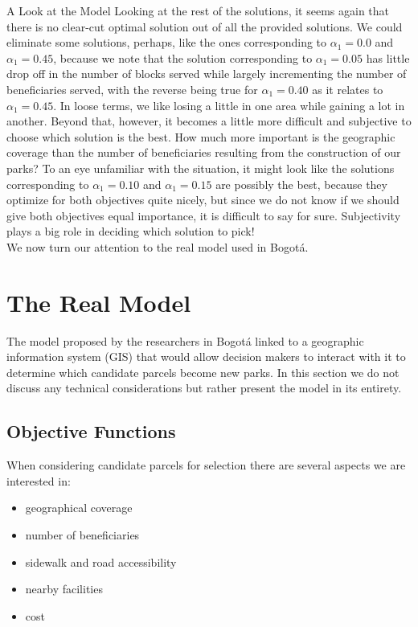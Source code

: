 \documentclass[12pt]{pom_thesis}
\theoremstyle{definition}
\begin{document}
\begin{chapter}{A Look at the Model}
Looking at the rest of the solutions, it seems again that there is no clear-cut optimal solution out of all the provided solutions. We could eliminate some solutions, perhaps, like the ones corresponding to $\alpha_1 = 0.0$ and $\alpha_1 = 0.45$, because we note that the solution corresponding to $\alpha_1 = 0.05$ has little drop off in the number of blocks served while largely incrementing the number of beneficiaries served, with the reverse being true for $\alpha_1 = 0.40$ as it relates to $\alpha_1 = 0.45$. In loose terms, we like losing a little in one area while gaining a lot in another. Beyond that, however, it becomes a little more difficult and subjective to choose which solution is the best. How much more important is the geographic coverage than the number of beneficiaries resulting from the construction of our parks? To an eye unfamiliar with the situation, it might look like the solutions corresponding to $\alpha_1 = 0.10$ and $\alpha_1 = 0.15$ are possibly the best, because they optimize for both objectives quite nicely, but since we do not know if we should give both objectives equal importance, it is difficult to say for sure. Subjectivity plays a big role in deciding which solution to pick! \\

We now turn our attention to the real model used in Bogot\'{a}.
%
%
\section{The Real Model}
The model proposed by the researchers in Bogot\'{a} linked to a geographic information system (GIS) that would allow decision makers to interact with it to determine which candidate parcels become new parks. In this section we do not discuss any technical considerations but rather present the model in its entirety. \\

%
%
\subsection{Objective Functions}
When considering candidate parcels for selection there are several aspects we are interested in:
\newpage
\begin{itemize}
\item geographical coverage 
\item number of beneficiaries
\item sidewalk and road accessibility
\item nearby facilities
\item cost 
\end{itemize}


\end{chapter}
\end{document}
